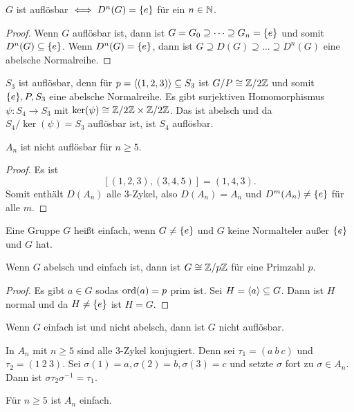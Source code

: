 \begin{Satz}
    $G$ ist auflösbar $\iff D^n(G)=\{e\}$ für ein $n\in\mathbb{N}$.
\end{Satz}
\begin{proof}
    Wenn $G$ auflösbar ist, dann ist $G=G_0\supseteq\dots\supseteq G_n=\{e\}$ und somit $D^n(G)\subseteq \{e\}$.
    Wenn $D^n(G)=\{e\}$, dann ist $G\supseteq D(G)\supseteq\dots\supseteq D^n(G)$ eine abelsche Normalreihe.
\end{proof}
\begin{Bsp}
    $S_3$ ist auflösbar, denn für $p=\langle(1,2,3)\rangle\subseteq S_3$ ist $G/P\cong \mathbb{Z}/2\mathbb{Z}$ und somit $\{e\}, P,S_3$ eine abelsche Normalreihe.
    Es gibt surjektiven Homomorphismus $\psi\colon S_4\to S_3$ mit $\ker(\psi)\cong \mathbb{Z}/2\mathbb{Z}\times\mathbb{Z}/2\mathbb{Z}$. Das ist abelsch und da $S_4/\ker(\psi)=S_3$ auflösbar ist, ist $S_4$ auflösbar.
\end{Bsp}
\begin{Satz}
    $A_n$ ist nicht auflösbar für $n\geq 5$.
\end{Satz}
\begin{proof}
    Es ist $$[(1,2,3),(3,4,5)]=(1,4,3).$$ Somit enthält $D(A_n)$ alle 3-Zykel, also $D(A_n)=A_n$ und $D^m(A_n)\neq\{e\}$ für alle $m$.
\end{proof}
\begin{Def}
    Eine Gruppe $G$ heißt einfach, wenn $G\neq \{e\}$ und $G$ keine Normalteler außer $\{e\}$ und $G$ hat.
\end{Def}
\begin{Bem}
    Wenn $G$ abelsch und einfach ist, dann ist $G\cong \mathbb{Z}/p\mathbb{Z}$ für eine Primzahl $p.$
\end{Bem}
\begin{proof}
    Es gibt $a\in G$ sodas $\operatorname{ord}(a)=p$ prim ist. Sei $H=\langle a\rangle\subseteq G$. Dann ist $H$ normal und da $H\neq \{e\}$ ist $H=G$.
\end{proof}
\begin{Bem} Wenn $G$ einfach ist und nicht abelsch, dann ist $G$ nicht auflösbar.
\end{Bem}
\begin{Bem}
    In $A_n$ mit $n\geq 5$ sind alle 3-Zykel konjugiert. Denn sei $\tau_1=(a \ b\ c)$ und $\tau_2=(1\ 2\ 3)$. Sei $\sigma(1)=a, \sigma(2)=b, \sigma(3)=c$ und setzte $\sigma$ fort zu $\sigma\in A_n$. Dann ist $\sigma\tau_2\sigma^{-1}=\tau_1$.
\end{Bem}
\begin{Satz}
    Für $n\geq 5$ ist $A_n$ einfach.
\end{Satz}

